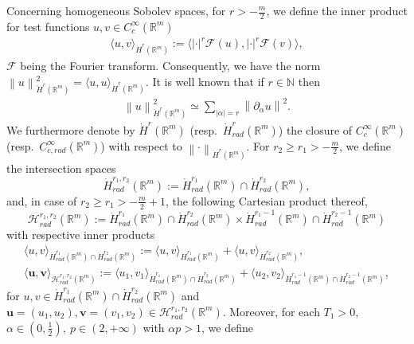 \documentclass[12pt,reqno]{amsart}
\theoremstyle{plain}
\theoremstyle{remark}
\theoremstyle{plain}
\theoremstyle{definition}
\numberwithin{equation}{section}
\numberwithin{equation}{section}
\def\N{{\mathbb N}}
\def\R{{\mathbb R}}
\newcommand{\norm}[1]{\left\|#1\right\|}
\newcommand{\HH}{\mathcal{H}}
\begin{document}
	 Concerning homogeneous Sobolev spaces, for $r > -\frac{m}{2}$, we define the inner product for test functions $u,v\in C^{\infty}_c(\R^m)$
	\begin{align*}
		\langle u,v\rangle_{\dot{H}^r(\R^m)}:=\langle  \lvert \cdot\rvert^r \mathscr{F}(u), \lvert \cdot\rvert^r \mathscr{F}(v)\rangle,
	\end{align*}
	$\mathscr{F}$ being the Fourier transform. Consequently, we have the norm $\norm{u}_{\dot{H}^r(\R^m)}^2=\langle u,u\rangle_{\dot{H}^r(\R^m)}.$ It is well known that if $r\in \N$ then
	\begin{align*}
		\norm{u}_{\dot{H}^r(\R^m)}^2\simeq \sum_{\lvert \alpha\rvert=r}\norm{ \partial_{\alpha}u}^2.
	\end{align*}
	We furthermore denote by $\dot{H}^r(\R^m)$ (resp.~$\dot{H}^r_{rad}(\R^m)$) the closure of $C^{\infty}_c(\R^m)$ (resp.~$C^{\infty}_{c,rad}(\R^m)$) with respect to $\norm{\cdot}_{\dot{H}^r(\R^m)}$.
	 For $r_2\geq r_1>-\frac{m}{2}$, we define the intersection spaces 
	\begin{equation*}
	    \dot{H}_{rad}^{r_1,r_2}(\R^m):=\dot{H}^{r_1}_{rad}(\R^m)\cap \dot{H}_{rad}^{r_2}(\R^m),
	\end{equation*}
	and, in case of $r_2\geq r_1>-\frac{m}{2}+1$, the following Cartesian product thereof,
	\begin{equation*}
	    \HH_{rad}^{r_1,r_2}(\R^m):=\dot{H}_{rad}^{r_1}(\R^m)\cap \dot{H}_{rad}^{r_2}(\R^m)\times \dot{H}_{rad}^{r_1-1}(\R^m)\cap \dot{H}_{rad}^{r_2-1}(\R^m)
	\end{equation*}
	with respective inner products
	\begin{gather*}
		\langle u,v\rangle_{\dot{H}^{r_1}_{rad}(\R^m)\cap \dot{H}_{rad}^{r_2}(\R^m)}:=\langle u,v\rangle_{\dot{H}^{r_1}_{rad}(\R^m)}+\langle u,v\rangle_{\dot{H}^{r_2}_{rad}(\R^m)},\\
        \langle \mathbf{u},\mathbf{v}\rangle_{\HH_{rad}^{r_1,r_2}(\R^m)}:=\langle u_1,v_1\rangle_{\dot{H}^{r_1}_{rad}(\R^m)\cap \dot{H}_{rad}^{r_2}(\R^m)}+\langle u_2,v_2\rangle_{\dot{H}^{r_1-1}_{rad}(\R^m)\cap \dot{H}_{rad}^{r_2-1}(\R^m)},
    \end{gather*}
    for $u,v\in \dot{H}^{r_1}_{rad}(\R^m)\cap \dot{H}_{rad}^{r_2}(\R^m)$ and $\mathbf{u}=(u_1,u_2),\mathbf{v}=(v_1,v_2)\in \HH_{rad}^{r_1,r_2}(\R^m)$.
	Moreover, for each $T_1>0,$ $\alpha\in (0,\frac{1}{2}),\ p\in (2,+\infty)$ with $\alpha p>1$, we define 
\end{document}
